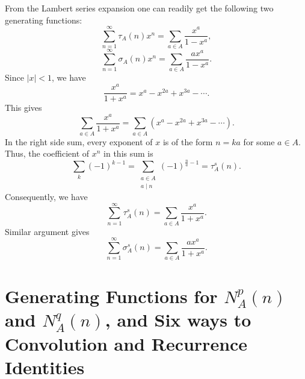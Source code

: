 \documentclass[11pt]{article}
\begin{document}
From the Lambert series expansion one can readily get the following two generating functions:
\begin{equation}\label{gf5}
\sum_{n=1}^{\infty}\tau_A(n)x^n=\sum_{a\in A}\frac{x^a}{1-x^a},
\end{equation}
\begin{equation}\label{gf6}
\sum_{n=1}^{\infty}\sigma_A(n)x^n=\sum_{a\in A}\frac{ax^a}{1-x^a}.
\end{equation}
Since $|x|<1$, we have
\[\frac{x^a}{1+x^a}=x^a-x^{2a}+x^{3a}-\cdots .
\]
This gives 
\[\sum_{a\in A}\frac{x^a}{1+x^a}=\sum_{a\in A}(x^a-x^{2a}+x^{3a}-\cdots).
\]
In the right side sum, every exponent of $x$ is of the form $n=ka$ for some $a\in A$. Thus, the coefficient of $x^n$ in this sum is 
\[
\sum_{k}(-1)^{k-1}=\sum_{\substack{a\in A\\ a\mid n}}(-1)^{\frac{n}{a}-1}=\tau_A^s(n).
\]
Consequently, we have
\begin{equation}\label{gf7}
\sum_{n=1}^{\infty}\tau_A^s(n)=\sum_{a\in A}\frac{x^a}{1+x^a}.
\end{equation}
Similar argument gives
\begin{equation}\label{gf8}
\sum_{n=1}^{\infty}\sigma_A^s(n)=\sum_{a\in A}\frac{ax^a}{1+x^a}.
\end{equation}

\section{ Generating Functions for $N_A^p(n)$ and $N_A^q(n)$, and Six ways to Convolution and Recurrence Identities}
\end{document}
